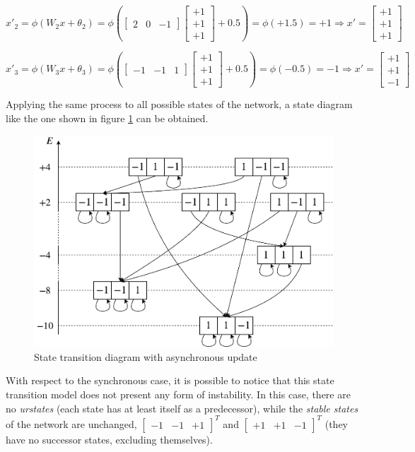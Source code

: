 \documentclass[letterpaper,headings=standardclasses]{scrartcl}
\begin{document}
\begin{itemize}
$$ x'_{2} = \phi(W_2 x + \theta_2) = \phi \left( \left[ \begin{matrix} 2 & 0 & -1 \end{matrix} \right] \left[ \begin{matrix} +1 \\ +1 \\ +1 \end{matrix} \right] + 0.5 \right) = \phi \left( +1.5 \right) = +1 \Rightarrow x' = \left[ \begin{matrix} +1 \\ +1 \\ +1 \end{matrix} \right] $$

$$ x'_{3} = \phi(W_3 x + \theta_3) = \phi \left( \left[ \begin{matrix} -1 & -1 & 1 \end{matrix} \right] \left[ \begin{matrix} +1 \\ +1 \\ +1 \end{matrix} \right] + 0.5 \right) = \phi \left( -0.5 \right) = -1 \Rightarrow x' = \left[ \begin{matrix} +1 \\ +1 \\ -1 \end{matrix} \right] $$
\end{itemize}

Applying the same process to all possible states of the network, a state diagram like the one shown in figure \ref{async} can be obtained.

\begin{figure}[h]
    \centering
    \includegraphics[width=0.7\linewidth]{async.pdf}
    \caption{State transition diagram with asynchronous update}
    \label{async}
\end{figure}

With respect to the synchronous case, it is possible to notice that this state transition model does not present any form of instability. In this case, there are no \emph{urstates} (each state has at least itself as a predecessor), while the \emph{stable states} of the network are unchanged, $[\begin{matrix} -1 & -1 & +1 \end{matrix}]^T$ and $[\begin{matrix} +1 & +1 & -1 \end{matrix}]^T$ (they have no successor states, excluding themselves).
\end{document}
